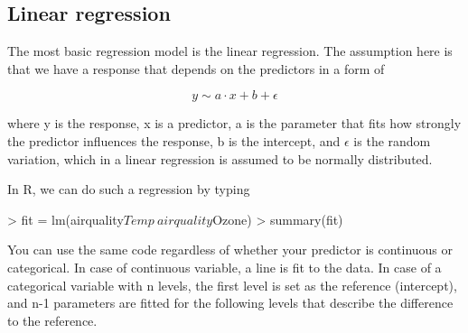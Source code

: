 \documentclass[a4paper,twoside]{tufte-book} %
\begin{document}
\subsection{Linear regression}

The most basic regression model is the linear regression. The assumption here is that we have a response that depends on the predictors in a form of 

\begin{equation} \label{eq: linear regression}
y \sim a \cdot x + b + \epsilon 
\end{equation}

where y is the response, x is a predictor, a is the parameter that fits how strongly the predictor influences the response, b is the intercept, and $\epsilon$ is the random variation, which in a linear regression is assumed to be normally distributed. 

In R, we can do such a regression by typing

\begin{Schunk}
\begin{Sinput}
> fit = lm(airquality$Temp~airquality$Ozone)
> summary(fit)
\end{Sinput}
\end{Schunk}

You can use the same code regardless of whether your predictor is continuous or categorical. In case of continuous variable, a line is fit to the data. In case of a categorical variable with n levels, the first level is set as the reference (intercept), and n-1 parameters are fitted for the following levels that describe the difference to the reference. 
\end{document}
